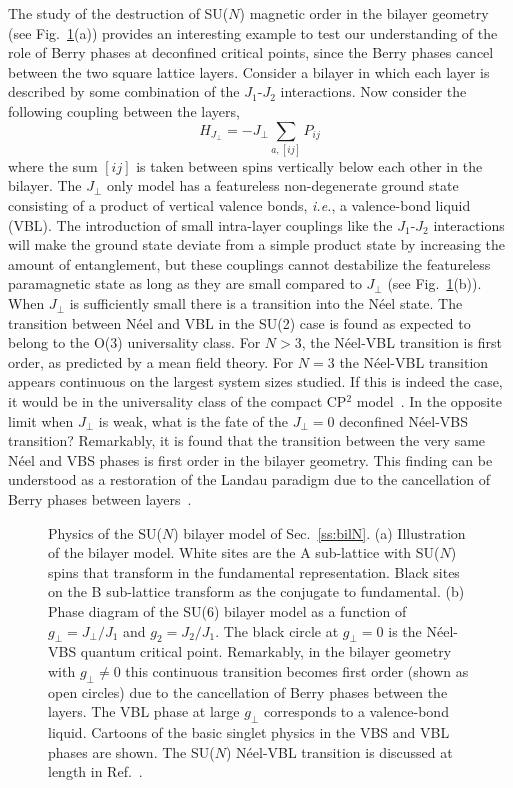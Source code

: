 \documentclass[range]{ar2e}
\begin{document}
The study of the destruction of SU($N$) magnetic order in the bilayer geometry (see Fig.~\ref{fig:pd_bil}(a)) provides an interesting example to test our
understanding of the role of Berry phases at deconfined critical points, since the Berry phases cancel between the two square lattice layers. Consider a bilayer in which each layer is described by some
combination of the $J_1$-$J_2$ interactions. Now consider the
following coupling between the layers,
\begin{equation}
 H_{J_\perp} = -J_\perp \sum_{a,[ij]} P_{ij}
\end{equation}
where the sum $[ij]$ is taken between spins vertically below each other
in the bilayer. The $J_\perp$ only model has a featureless non-degenerate ground state
consisting of a product of vertical valence bonds, {\em i.e.}, a valence-bond liquid (VBL). The introduction of small intra-layer couplings like the $J_1$-$J_2$ interactions will
make the ground state deviate from a simple product state by
increasing the amount of entanglement, but these couplings
 cannot destabilize the featureless paramagnetic
state as long as they are small compared to $J_\perp$ (see Fig.~\ref{fig:pd_bil}(b)). When $J_\perp$ is sufficiently small there is a transition into the N\'eel state. The transition between N\'eel and VBL in the SU(2) case is found as expected to belong to the O(3) universality class. For $N>3$, the N\'eel-VBL transition is first order, as predicted by a mean field theory. For $N=3$ the N\'eel-VBL transition appears continuous on the largest system sizes studied. If this is indeed the case, it would be in the universality class of the compact CP$^2$ model~\cite{nahum2011:loops}.  In the opposite limit when $J_\perp$ is weak, what is the fate of the $J_\perp=0$ deconfined N\'eel-VBS transition? 
Remarkably, it is found that the transition between the very same N\'eel and VBS phases is first order in the bilayer geometry. This finding can be understood as a restoration of the Landau paradigm due to the cancellation of Berry phases between layers~\cite{kaul2012:sun_bil}.



\begin{figure}
\centerline{}
  \caption{ \label{fig:pd_bil}  Physics of the SU($N$) bilayer model  of Sec.~\ref{ss:bilN}.  (a) Illustration of the bilayer model. White sites are the A sub-lattice with SU($N$) spins that transform in the fundamental representation. Black sites on the B sub-lattice transform as the conjugate to fundamental. (b) Phase diagram of the
    SU($6$) bilayer model as a function of $g_\perp =J_\perp/J_1$ and $g_2=J_2/J_1$. The black circle at $g_\perp=0$ is the N\'eel-VBS quantum critical point. Remarkably, in the bilayer geometry with $g_\perp\neq 0$ this continuous transition becomes first order (shown as open circles) due to the cancellation of Berry phases between the layers. The VBL phase at large $g_\perp$ corresponds to a valence-bond liquid. Cartoons of the basic singlet physics in the VBS and VBL phases are shown. The SU($N$) N\'eel-VBL transition is discussed at length in Ref.~\cite{kaul2012:sun_bil}.}
\end{figure}
\end{document}
